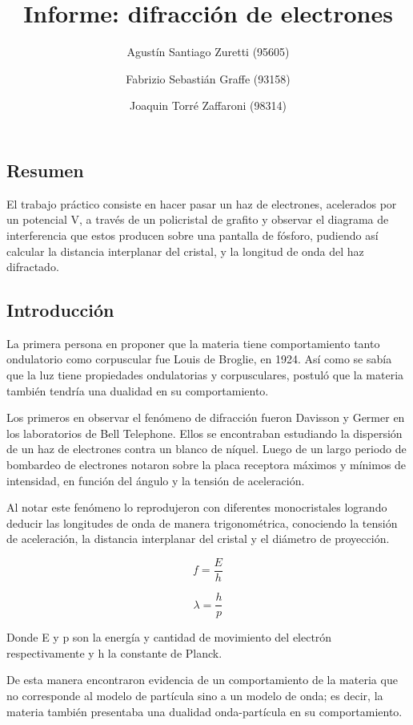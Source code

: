 \documentclass[]{article}
\title{Informe: difracción de electrones}
\author{Agustín Santiago Zuretti (95605) \and Fabrizio Sebastián Graffe (93158) \and Joaquin Torré Zaffaroni (98314)}
\date{}
\begin{document}
\maketitle

{
\setcounter{tocdepth}{3}
\tableofcontents
}
\newpage

\hypertarget{resumen}{%
\subsection{Resumen}\label{resumen}}

El trabajo práctico consiste en hacer pasar un haz de electrones,
acelerados por un potencial V, a través de un policristal de grafito y
observar el diagrama de interferencia que estos producen sobre una
pantalla de fósforo, pudiendo así calcular la distancia interplanar del
cristal, y la longitud de onda del haz difractado.

\hypertarget{introducciuxf3n}{%
\subsection{Introducción}\label{introducciuxf3n}}

La primera persona en proponer que la materia tiene comportamiento tanto
ondulatorio como corpuscular fue Louis de Broglie, en 1924. Así como se
sabía que la luz tiene propiedades ondulatorias y corpusculares, postuló
que la materia también tendría una dualidad en su comportamiento.

Los primeros en observar el fenómeno de difracción fueron Davisson y
Germer en los laboratorios de Bell Telephone. Ellos se encontraban
estudiando la dispersión de un haz de electrones contra un blanco de
níquel. Luego de un largo periodo de bombardeo de electrones notaron
sobre la placa receptora máximos y mínimos de intensidad, en función del
ángulo y la tensión de aceleración.

Al notar este fenómeno lo reprodujeron con diferentes monocristales
logrando deducir las longitudes de onda de manera trigonométrica,
conociendo la tensión de aceleración, la distancia interplanar del
cristal y el diámetro de proyección.

\[f = \frac{E}{h}\]

\[\lambda = \frac{h}{p}\]

Donde E y p son la energía y cantidad de movimiento del electrón
respectivamente y h la constante de Planck.

De esta manera encontraron evidencia de un comportamiento de la materia
que no corresponde al modelo de partícula sino a un modelo de onda; es
decir, la materia también presentaba una dualidad onda-partícula en su
comportamiento.
\end{document}
